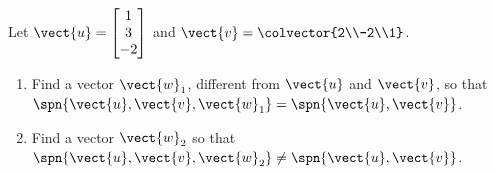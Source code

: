 Let $\vect{u} = \begin{bmatrix}1\\3\\-2 \end{bmatrix}$ and $\vect{v} = \colvector{2\\-2\\1}$. 
\begin{enumerate}
\item Find a vector $\vect{w}_1$, different from $\vect{u}$ and $\vect{v}$,  so that $\spn{\vect{u}, \vect{v}, \vect{w}_1} = \spn{\vect{u}, \vect{v}}$.
%
\item Find a vector $\vect{w}_2$ so that $\spn{\vect{u}, \vect{v}, \vect{w}_2} \ne \spn{\vect{u}, \vect{v}}$.
\end{enumerate}